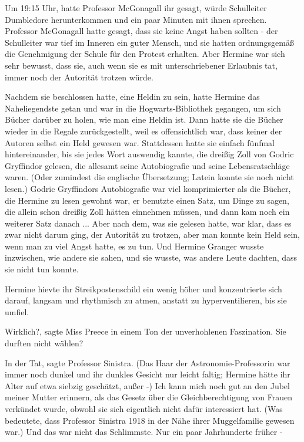 Um 19:15 Uhr, hatte Professor McGonagall ihr gesagt, würde Schulleiter
Dumbledore herunterkommen und ein paar Minuten mit ihnen sprechen. Professor
McGonagall hatte gesagt, dass sie keine Angst haben sollten - der Schulleiter
war tief im Inneren ein guter Mensch, und sie hatten ordnungsgemäß die
Genehmigung der Schule für den Protest erhalten. Aber Hermine war sich sehr
bewusst, dass sie, auch wenn sie es mit unterschriebener Erlaubnis tat, immer
noch der Autorität trotzen würde.

Nachdem sie beschlossen hatte, eine Heldin zu sein, hatte Hermine das
Naheliegendste getan und war in die Hogwarts-Bibliothek gegangen, um sich Bücher
darüber zu holen, wie man eine Heldin ist. Dann hatte sie die Bücher wieder in
die Regale zurückgestellt, weil es offensichtlich war, dass keiner der Autoren
selbst ein Held gewesen war. Stattdessen hatte sie einfach fünfmal
hintereinander, bis sie jedes Wort auswendig kannte, die dreißig Zoll von Godric
Gryffindor gelesen, die allesamt seine Autobiografie und seine Lebensratschläge
waren. (Oder zumindest die englische Übersetzung; Latein konnte sie noch nicht
lesen.) Godric Gryffindors Autobiografie war viel komprimierter als die Bücher,
die Hermine zu lesen gewohnt war, er benutzte einen Satz, um Dinge zu sagen, die
allein schon dreißig Zoll hätten einnehmen müssen, und dann kam noch ein
weiterer Satz danach ... Aber nach dem, was sie gelesen hatte, war klar, dass es
zwar nicht darum ging, der Autorität zu trotzen, aber man konnte kein Held sein,
wenn man zu viel Angst hatte, es zu tun. Und Hermine Granger wusste inzwischen,
wie andere sie sahen, und sie wusste, was andere Leute dachten, dass sie nicht
tun konnte.

Hermine hievte ihr Streikpostenschild ein wenig höher und konzentrierte sich
darauf, langsam und rhythmisch zu atmen, anstatt zu hyperventilieren, bis sie
umfiel.

\glqq{}Wirklich?\grqq{}, sagte Miss Preece in einem Ton der unverhohlenen
Faszination. \glqq{}Sie durften nicht wählen?\grqq{}

\glqq{}In der Tat\grqq{}, sagte Professor Sinistra. (Das Haar der
Astronomie-Professorin war immer noch dunkel und ihr dunkles Gesicht nur leicht
faltig; Hermine hätte ihr Alter auf etwa siebzig geschätzt, außer -) \glqq{}Ich
kann mich noch gut an den Jubel meiner Mutter erinnern, als das Gesetz über die
Gleichberechtigung von Frauen verkündet wurde, obwohl sie sich eigentlich nicht
dafür interessiert hat.\grqq{} (Was bedeutete, dass Professor Sinistra 1918 in
der Nähe ihrer Muggelfamilie gewesen war.) \glqq{}Und das war nicht das
Schlimmste. Nur ein paar Jahrhunderte früher -\grqq{}

